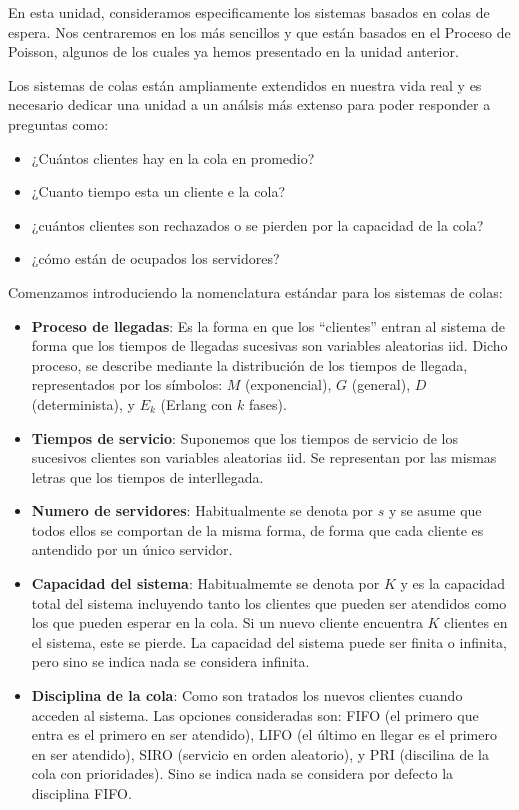 \documentclass[
]{book}
\providecommand{\tightlist}{%
  \setlength{\itemsep}{0pt}\setlength{\parskip}{0pt}}
\theoremstyle{definition}
\theoremstyle{definition}
\theoremstyle{definition}
\theoremstyle{definition}
\theoremstyle{remark}
\begin{document}
En esta unidad, consideramos especificamente los sistemas basados en colas de espera. Nos centraremos en los más sencillos y que están basados en el Proceso de Poisson, algunos de los cuales ya hemos presentado en la unidad anterior.

Los sistemas de colas están ampliamente extendidos en nuestra vida real y es necesario dedicar una unidad a un análsis
más extenso para poder responder a preguntas como:

\begin{itemize}
\tightlist
\item
  ¿Cuántos clientes hay en la cola en promedio?
\item
  ¿Cuanto tiempo esta un cliente e la cola?
\item
  ¿cuántos clientes son rechazados o se pierden por la capacidad de la cola?
\item
  ¿cómo están de ocupados los servidores?
\end{itemize}

Comenzamos introduciendo la nomenclatura estándar para los sistemas de colas:

\begin{itemize}
\item
  \textbf{Proceso de llegadas}: Es la forma en que los ``clientes'' entran al sistema de forma que los tiempos de llegadas sucesivas son variables aleatorias iid. Dicho proceso, se describe mediante la distribución de los tiempos de llegada, representados por los símbolos: \(M\) (exponencial), \(G\) (general), \(D\) (determinista), y \(E_k\) (Erlang con \(k\) fases).
\item
  \textbf{Tiempos de servicio}: Suponemos que los tiempos de servicio de los sucesivos clientes son variables aleatorias iid. Se representan por las mismas letras que los tiempos de interllegada.
\item
  \textbf{Numero de servidores}: Habitualmente se denota por \(s\) y se asume que todos ellos se comportan de la misma forma, de forma que cada cliente es antendido por un único servidor.
\item
  \textbf{Capacidad del sistema}: Habitualmemte se denota por \(K\) y es la capacidad total del sistema incluyendo tanto los clientes que pueden ser atendidos como los que pueden esperar en la cola. Si un nuevo cliente encuentra \(K\) clientes en el sistema, este se pierde. La capacidad del sistema puede ser finita o infinita, pero sino se indica nada se considera infinita.
\item
  \textbf{Disciplina de la cola}: Como son tratados los nuevos clientes cuando acceden al sistema. Las opciones consideradas son: FIFO (el primero que entra es el primero en ser atendido), LIFO (el último en llegar es el primero en ser atendido), SIRO (servicio en orden aleatorio), y PRI (discilina de la cola con prioridades). Sino se indica nada se considera por defecto la disciplina FIFO.
\end{itemize}
\end{document}
